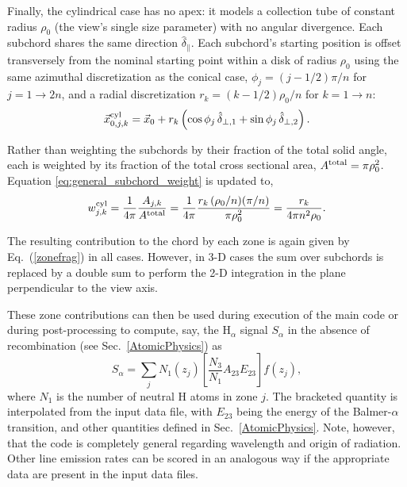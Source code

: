 \documentclass[12pt]{report}
\begin{document}
Finally, the cylindrical case has no apex: it models a collection tube of
constant radius $\rho_0$ (the view's single size parameter) with no
angular divergence. Each subchord shares the same direction $\hat{\delta}_{\parallel}$. 
Each subchord's starting position is offset transversely from the nominal
starting point within a disk of radius $\rho_0$ using
the same azimuthal discretization as the conical case,
$\phi_j = (j-1/2)\pi/n$ for $j = 1 \rightarrow 2n$, and a radial
discretization $r_k = (k-1/2)\rho_0/n$ for $k = 1 \rightarrow n$:
\begin{equation}
\vec{x}_{0,j,k}^{\rm cyl} = \vec{x}_0 + r_k \left( \cos\phi_j \,
\hat{\delta}_{\perp,1} + \sin\phi_j \, \hat{\delta}_{\perp,2} \right).
\end{equation}

Rather than weighting the subchords by their fraction of the total solid angle,
each is weighted by its fraction of the total cross sectional area, $A^{\rm total}=\pi\rho_0^2$. 
Equation \ref{eq:general_subchord_weight} is updated to,
\begin{equation}
w_{j,k}^{\rm cyl}  = \frac{1}{4\pi}\frac{A_{j,k}}{A^{\rm total}} = \frac{1}{4\pi} \frac{r_k \, (\rho_0/n)(\pi/n)}{\pi
\rho_0^2} = \frac{r_k}{4\pi n^2 \rho_0}.
\end{equation}

The resulting contribution to the chord by each zone
is again given by Eq.~(\ref{zonefrag}) in all cases. However, in 3-D cases the sum over subchords 
is replaced by a double sum to perform the 2-D integration in the plane perpendicular to the view axis. 

These zone contributions can then be used during execution of the main
code or during post-processing to compute, say, the 
H$_{\alpha}$ signal $S_{\alpha}$
in the absence of recombination  (see Sec.~\ref{AtomicPhysics}) as
\begin{equation}
S_{\alpha} = \sum_{j} N_{1}(z_{j}) \left[ \frac{N_{3}}{N_{1}} 
A_{23} E_{23} \right] f(z_{j}),
\end{equation}
where $N_{1}$ is the number of neutral H atoms in zone $j$. The
bracketed quantity is interpolated from the input data file, with $E_{23}$
being the energy of the Balmer-$\alpha$ transition, and other quantities
defined in Sec.~\ref{AtomicPhysics}.
Note, however, that the code is completely general regarding wavelength 
and origin of radiation. Other line emission rates can be scored in
an analogous way if the appropriate data are present in the input data
files. 
\end{document}
